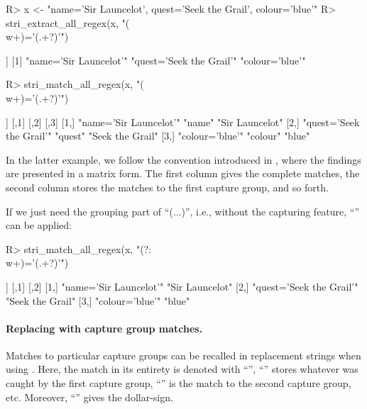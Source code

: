 \documentclass[nojss]{jss}
\newcommand{\str}[1]{\code{{#1}}}
\begin{document}
\begin{Schunk}
\begin{Sinput}
R> x <- "name='Sir Launcelot', quest='Seek the Grail', colour='blue'"
R> stri_extract_all_regex(x, "(\\w+)='(.+?)'")
\end{Sinput}
\begin{Soutput}
[[1]]
[1] "name='Sir Launcelot'"   "quest='Seek the Grail'" "colour='blue'"
\end{Soutput}
\begin{Sinput}
R> stri_match_all_regex(x, "(\\w+)='(.+?)'")
\end{Sinput}
\begin{Soutput}
[[1]]
     [,1]                     [,2]     [,3]
[1,] "name='Sir Launcelot'"   "name"   "Sir Launcelot"
[2,] "quest='Seek the Grail'" "quest"  "Seek the Grail"
[3,] "colour='blue'"          "colour" "blue"
\end{Soutput}
\end{Schunk}

In the latter example, we follow the convention introduced in ,
where the findings are presented in a matrix form. The first column
gives the complete matches, the second column stores the matches to the
first capture group, and so forth.

If we just need the grouping part of ``\code(...)'', i.e.,
without the capturing feature,
``'' can be applied:

\begin{Schunk}
\begin{Sinput}
R> stri_match_all_regex(x, "(?:\\w+)='(.+?)'")
\end{Sinput}
\begin{Soutput}
[[1]]
     [,1]                     [,2]
[1,] "name='Sir Launcelot'"   "Sir Launcelot"
[2,] "quest='Seek the Grail'" "Seek the Grail"
[3,] "colour='blue'"          "blue"
\end{Soutput}
\end{Schunk}


\paragraph{Replacing with capture group matches.}
Matches to particular capture groups can be recalled in replacement strings
when using .
Here, the match in its entirety is denoted with ``\str{\$0}'',
``\str{\$1}'' stores whatever was caught by the first capture group,
``\str{\$2}'' is the match to the second capture group, etc.
Moreover, ``\str{\textbackslash{}\$}'' gives the dollar-sign.
\end{document}
